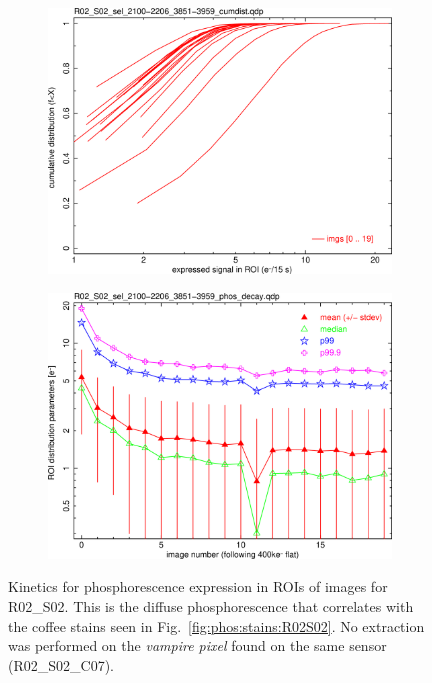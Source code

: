 \begin{figure}[!htbp]
\begin{subfigure}{0.45\textwidth}
  \includegraphics[width=\textwidth]{figures/phosphorescence-survey/phos_kinetics/R02_S02_sel_2100-2206_3851-3959_cumdist.png}    
\end{subfigure}
\hfil
\begin{subfigure}{0.45\textwidth}
  \centering
  \includegraphics[width=\textwidth]{figures/phosphorescence-survey/phos_kinetics/R02_S02_sel_2100-2206_3851-3959_phos_decay.png}
\end{subfigure}
\newline
\caption{Kinetics for phosphorescence expression in ROIs of images for R02\_S02. This is the diffuse phosphorescence that correlates with the coffee stains seen in Fig.~\ref{fig:phos:stains:R02S02}. No extraction was performed on the {\it vampire pixel} found on the same sensor (R02\_S02\_C07).}
\label{fig:phos:kinetics:R02S02}
\end{figure}

